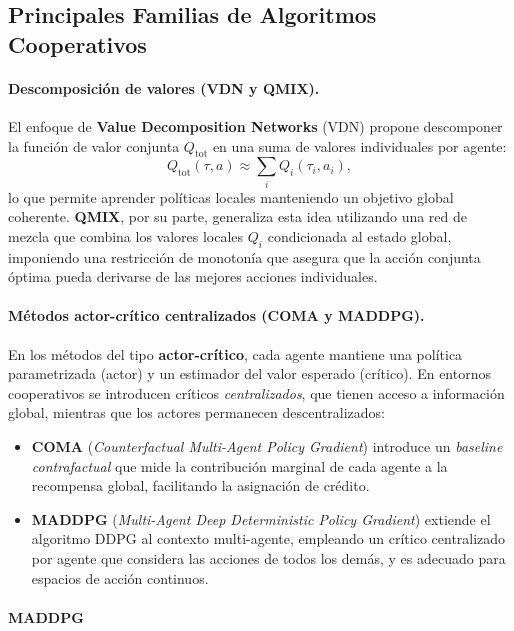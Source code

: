 \subsection{Principales Familias de Algoritmos Cooperativos}

\paragraph{Descomposición de valores (VDN y QMIX).}
El enfoque de \textbf{Value Decomposition Networks} (VDN) propone descomponer la función de valor conjunta $Q_{\text{tot}}$ en una suma de valores individuales por agente:
\[
Q_{\text{tot}}(\tau, a) \approx \sum_i Q_i(\tau_i, a_i),
\]
lo que permite aprender políticas locales manteniendo un objetivo global coherente.  
\textbf{QMIX}, por su parte, generaliza esta idea utilizando una red de mezcla que combina los valores locales $Q_i$ condicionada al estado global, imponiendo una restricción de monotonía que asegura que la acción conjunta óptima pueda derivarse de las mejores acciones individuales. \cite{vdn,qmix}

\paragraph{Métodos actor-crítico centralizados (COMA y MADDPG).}
En los métodos del tipo \textbf{actor-crítico}, cada agente mantiene una política parametrizada (actor) y un estimador del valor esperado (crítico).  
En entornos cooperativos se introducen críticos \emph{centralizados}, que tienen acceso a información global, mientras que los actores permanecen descentralizados:
\begin{itemize}
  \item \textbf{COMA} (\emph{Counterfactual Multi-Agent Policy Gradient}) introduce un \emph{baseline contrafactual} que mide la contribución marginal de cada agente a la recompensa global, facilitando la asignación de crédito. \cite{coma}
  \item \textbf{MADDPG} (\emph{Multi-Agent Deep Deterministic Policy Gradient}) extiende el algoritmo DDPG al contexto multi-agente, empleando un crítico centralizado por agente que considera las acciones de todos los demás, y es adecuado para espacios de acción continuos. \cite{maddpg}
\end{itemize}




\paragraph{MADDPG}

